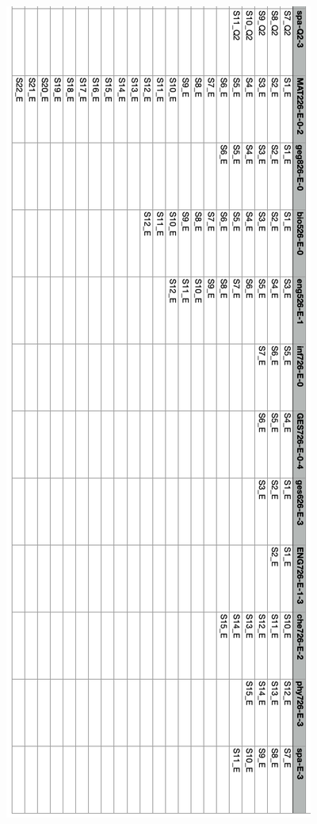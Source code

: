 \begin{figure}[H]
    \centering
    \includegraphics[width=0.6\linewidth]{docs/graphics/StudentList3.png}
\end{figure}

\newpage
